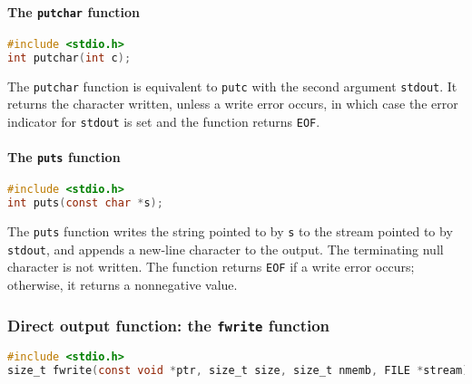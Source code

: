 \paragraph{The \texttt{putchar} function}
\lstset{basicstyle=\scriptsize, numbers=left, captionpos=b, tabsize=4}
\begin{lstlisting}[caption=Section \thesection listing \arabic{filecnt},language={C},
breaklines=true,xleftmargin=15pt,label=lst:section\thesection listing\arabic{filecnt}]
#include <stdio.h>
int putchar(int c);
\end{lstlisting}

The \texttt{putchar} function is equivalent to \texttt{putc} with the second
argument \texttt{stdout}. It returns the character written, unless a write
error occurs, in which case the error indicator for \texttt{stdout} is set and
the function returns \texttt{EOF}.

\paragraph{The \texttt{puts} function}
\lstset{basicstyle=\scriptsize, numbers=left, captionpos=b, tabsize=4}
\begin{lstlisting}[caption=Section \thesection listing \arabic{filecnt},language={C},
breaklines=true,xleftmargin=15pt,label=lst:section\thesection listing\arabic{filecnt}]
#include <stdio.h>
int puts(const char *s);
\end{lstlisting}

The \texttt{puts} function writes the string pointed to by \texttt{s} to the
stream pointed to by \texttt{stdout}, and appends a new-line character to the
output. The terminating null character is not written. The function returns
\texttt{EOF} if a write error occurs; otherwise, it returns a nonnegative
value.

\subsubsection{Direct output function: the \texttt{fwrite} function}
\lstset{basicstyle=\scriptsize, numbers=left, captionpos=b, tabsize=4}
\begin{lstlisting}[caption=Section \thesection listing \arabic{filecnt},language={C},
breaklines=true,xleftmargin=15pt,label=lst:section\thesection listing\arabic{filecnt}]
#include <stdio.h>
size_t fwrite(const void *ptr, size_t size, size_t nmemb, FILE *stream);
\end{lstlisting}

